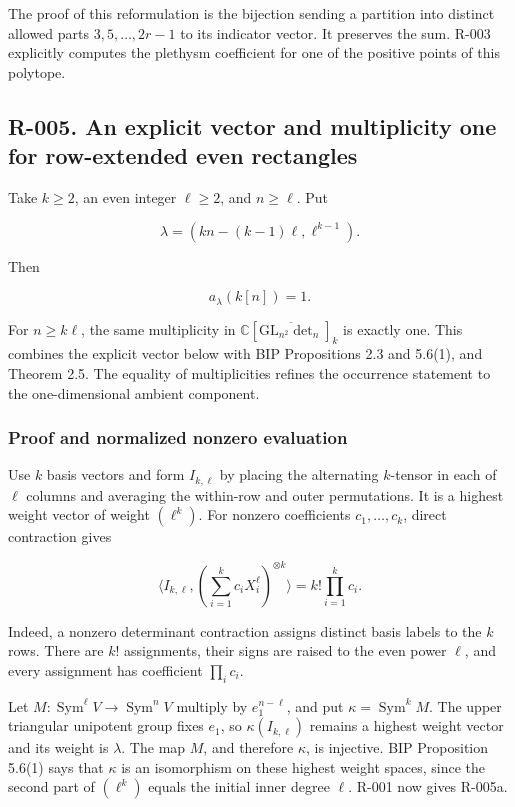 \documentclass[
  10pt,
]{article}
\begin{document}
The proof of this reformulation is the bijection sending a partition
into distinct allowed parts \(3,5,\ldots,2r-1\) to its indicator vector.
It preserves the sum. R-003 explicitly computes the plethysm coefficient
for one of the positive points of this polytope.

\subsection{R-005. An explicit vector and multiplicity one for
row-extended even
rectangles}\label{r-005.-an-explicit-vector-and-multiplicity-one-for-row-extended-even-rectangles}

Take \(k\ge2\), an even integer \(\ell\ge2\), and \(n\ge\ell\). Put

\[
\lambda=(kn-(k-1)\ell,\ell^{k-1}).
\]

Then

\[
a_\lambda(k[n])=1.
\tag{R-005a}
\]

For \(n\ge k\ell\), the same multiplicity in
\(\mathbb C[\overline{\mathrm{GL}_{n^2}\det_n}]_k\) is exactly one. This
combines the explicit vector below with BIP Propositions 2.3 and 5.6(1),
and Theorem 2.5. The equality of multiplicities refines the occurrence
statement to the one-dimensional ambient component.

\subsubsection{Proof and normalized nonzero
evaluation}\label{proof-and-normalized-nonzero-evaluation}

Use \(k\) basis vectors and form \(I_{k,\ell}\) by placing the
alternating \(k\)-tensor in each of \(\ell\) columns and averaging the
within-row and outer permutations. It is a highest weight vector of
weight \((\ell^k)\). For nonzero coefficients \(c_1,\ldots,c_k\), direct
contraction gives

\[
\big\langle I_{k,\ell},(\sum_{i=1}^k c_iX_i^\ell)^{\otimes k}\big\rangle
=k!\prod_{i=1}^k c_i.
\tag{R-005b}
\]

Indeed, a nonzero determinant contraction assigns distinct basis labels
to the \(k\) rows. There are \(k!\) assignments, their signs are raised
to the even power \(\ell\), and every assignment has coefficient
\(\prod_i c_i\).

Let \(M:\operatorname{Sym}^\ell V\to\operatorname{Sym}^nV\) multiply by
\(e_1^{n-\ell}\), and put \(\kappa=\operatorname{Sym}^kM\). The upper
triangular unipotent group fixes \(e_1\), so \(\kappa(I_{k,\ell})\)
remains a highest weight vector and its weight is \(\lambda\). The map
\(M\), and therefore \(\kappa\), is injective. BIP Proposition 5.6(1)
says that \(\kappa\) is an isomorphism on these highest weight spaces,
since the second part of \((\ell^k)\) equals the initial inner degree
\(\ell\). R-001 now gives R-005a.
\end{document}
